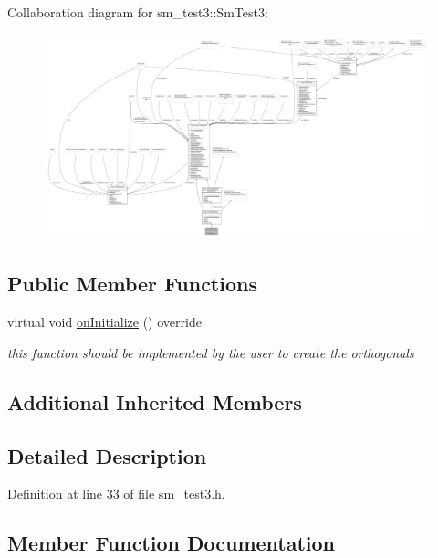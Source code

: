 Collaboration diagram for sm\+\_\+test3\+:\+:Sm\+Test3\+:
\nopagebreak
\begin{figure}[H]
\begin{center}
\leavevmode
\includegraphics[width=350pt]{structsm__test3_1_1SmTest3__coll__graph}
\end{center}
\end{figure}
\subsection*{Public Member Functions}
\begin{DoxyCompactItemize}
\item 
virtual void \hyperlink{structsm__test3_1_1SmTest3_a7bf3032514e07382732cff424ddc21cf}{on\+Initialize} () override
\begin{DoxyCompactList}\small\item\em this function should be implemented by the user to create the orthogonals \end{DoxyCompactList}\end{DoxyCompactItemize}
\subsection*{Additional Inherited Members}


\subsection{Detailed Description}


Definition at line 33 of file sm\+\_\+test3.\+h.



\subsection{Member Function Documentation}
